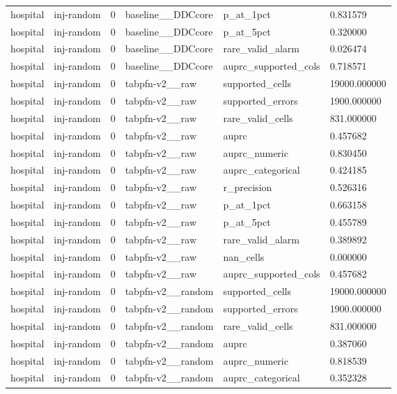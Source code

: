 \begin{tabular}{llllll}
hospital & inj-random & 0 & baseline\_\_DDCcore & p\_at\_1pct & 0.831579 \\
hospital & inj-random & 0 & baseline\_\_DDCcore & p\_at\_5pct & 0.320000 \\
hospital & inj-random & 0 & baseline\_\_DDCcore & rare\_valid\_alarm & 0.026474 \\
hospital & inj-random & 0 & baseline\_\_DDCcore & auprc\_supported\_cols & 0.718571 \\
hospital & inj-random & 0 & tabpfn-v2\_\_raw & supported\_cells & 19000.000000 \\
hospital & inj-random & 0 & tabpfn-v2\_\_raw & supported\_errors & 1900.000000 \\
hospital & inj-random & 0 & tabpfn-v2\_\_raw & rare\_valid\_cells & 831.000000 \\
hospital & inj-random & 0 & tabpfn-v2\_\_raw & auprc & 0.457682 \\
hospital & inj-random & 0 & tabpfn-v2\_\_raw & auprc\_numeric & 0.830450 \\
hospital & inj-random & 0 & tabpfn-v2\_\_raw & auprc\_categorical & 0.424185 \\
hospital & inj-random & 0 & tabpfn-v2\_\_raw & r\_precision & 0.526316 \\
hospital & inj-random & 0 & tabpfn-v2\_\_raw & p\_at\_1pct & 0.663158 \\
hospital & inj-random & 0 & tabpfn-v2\_\_raw & p\_at\_5pct & 0.455789 \\
hospital & inj-random & 0 & tabpfn-v2\_\_raw & rare\_valid\_alarm & 0.389892 \\
hospital & inj-random & 0 & tabpfn-v2\_\_raw & nan\_cells & 0.000000 \\
hospital & inj-random & 0 & tabpfn-v2\_\_raw & auprc\_supported\_cols & 0.457682 \\
hospital & inj-random & 0 & tabpfn-v2\_\_random & supported\_cells & 19000.000000 \\
hospital & inj-random & 0 & tabpfn-v2\_\_random & supported\_errors & 1900.000000 \\
hospital & inj-random & 0 & tabpfn-v2\_\_random & rare\_valid\_cells & 831.000000 \\
hospital & inj-random & 0 & tabpfn-v2\_\_random & auprc & 0.387060 \\
hospital & inj-random & 0 & tabpfn-v2\_\_random & auprc\_numeric & 0.818539 \\
hospital & inj-random & 0 & tabpfn-v2\_\_random & auprc\_categorical & 0.352328 \\

\end{tabular}
